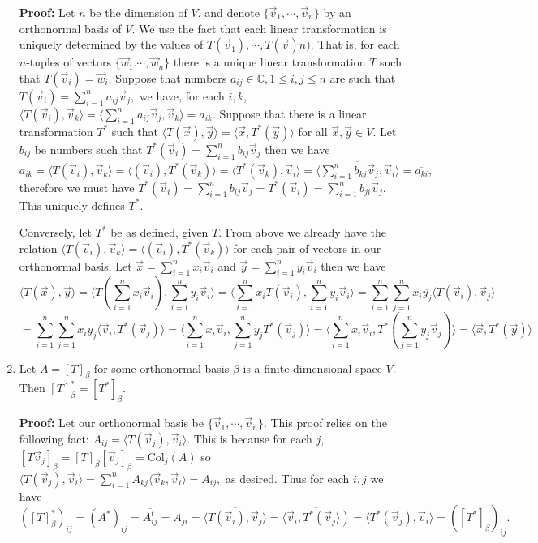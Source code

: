 \documentclass[11pt]{article}
\newcommand{\bbC}{\mathbb C}
\newcommand{\Col}{\mathrm{Col}}
\newcommand{\ol}{\overline}
\newcommand{\inner}[2]{\langle #1, #2\rangle}
\begin{document}
\begin{enumerate}
\textbf{Proof:}
Let $n$ be the dimension of $V$, and denote $\{\vec{v}_1, \cdots , \vec{v}_n\}$ by an orthonormal basis of $V$. 
We use the fact that each linear transformation is uniquely determined by the values of $T(\vec{v}_1), \cdots , T(\vec{v})n)$. 
That is, for each $n$-tuples of vectors $\{\vec{w}_1. \cdots , \vec{w}_n\}$ there is a unique linear transformation $T$ such that $T(\vec{v}_i)=\vec{w}_i.$
Suppose that numbers $a_{ij}\in\bbC, 1\le i, j\le n$ are such that 
$T(\vec{v}_i)=\displaystyle\sum_{i=1}^n a_{ij}\vec{v}_j, $ we have, for each $i, k$, 
$\inner{T(\vec{v}_i)}{\vec{v}_k}
=\inner{\displaystyle\sum_{i=1}^n a_{ij}\vec{v}_j}{\vec{v}_k}
=a_{ik}.  
$
Suppose that there is a linear transformation $T^*$ such that $\inner{T(\vec{x})}{\vec{y}}=\inner{\vec{x}}{T^*(\vec{y})}$ for all $\vec{x}, \vec{y}\in V$. 
Let $b_{ij}$ be numbers such that $T^*(\vec{v}_i)=\displaystyle\sum_{i=1}^n b_{ij}\vec{v}_j$ then we have 
$a_{ik}
=\inner{T(\vec{v}_i)}{\vec{v}_k}
=\inner{(\vec{v}_i)}{T^*(\vec{v}_k)}
=\ol{\inner{T^*(\vec{v}_k)}{\vec{v}_i}}
=\ol{\inner{\displaystyle\sum_{i=1}^n b_{kj}\vec{v}_j}{\vec{v}_i}}
=\ol{a_{ki}}, 
$
therefore we must have 
$T^*(\vec{v}_i)=\displaystyle\sum_{i=1}^n b_{ij}\vec{v}_j
=T^*(\vec{v}_i)=\displaystyle\sum_{i=1}^n \ol{b_{ji}}\vec{v}_j. 
$
This uniquely defines $T^*$. 

Conversely, let $T^*$ be as defined, given $T$. 
From above we already have the relation 
$\inner{T(\vec{v}_i)}{\vec{v}_k}=\inner{(\vec{v}_i)}{T^*(\vec{v}_k)}$ for each pair of vectors in our orthonormal basis. 
Let $\vec{x}=\displaystyle\sum_{i=1}^n x_i\vec{v}_i$ and 
$\vec{y}=\displaystyle\sum_{i=1}^n y_i\vec{v}_i$ then we have 
\[\inner{T(\vec{x})}{\vec{y}}
=\inner{T(\displaystyle\sum_{i=1}^n x_i\vec{v}_i)}{\displaystyle\sum_{i=1}^n y_i\vec{v}_i}
=\inner{\displaystyle \sum_{i=1}^n x_iT(\vec{v}_i)}{\displaystyle\sum_{i=1}^n y_i\vec{v}_i}
=\displaystyle \sum_{i=1}^n \displaystyle \sum_{j=1}^n x_i\ol{y_j}\inner{T(\vec{v}_i)}{\vec{v}_j}\]
\[
=\displaystyle \sum_{i=1}^n \displaystyle \sum_{j=1}^n x_i\ol{y_j}\inner{\vec{v}_i}{T^*(\vec{v}_j)}
=\inner{\displaystyle \sum_{i=1}^n  x_i\vec{v}_i}{\displaystyle \sum_{j=1}^n y_jT^*(\vec{v}_j)}
=\inner{\displaystyle \sum_{i=1}^n  x_i\vec{v}_i}{T^*(\displaystyle \sum_{j=1}^n y_j\vec{v}_j)}
=\inner{\vec{x}}{T^*(\vec{y})}
\]

\item Let $A=[T]_\beta$ for some orthonormal basis $\beta$ is a finite dimensional space $V$. Then $[T]_\beta^*=[T^*]_\beta$. 

\textbf{Proof:} Let our orthonormal basis be $\{\vec{v}_1, \cdots, \vec{v}_n\}$. 
This proof relies on the following fact: $A_{ij}=\inner{T(\vec{v}_j)}{\vec{v}_i}.$ 
This is because for each $j$, 
$[T\vec{v}_j]_\beta
=[T]_\beta[\vec{v}_j]_\beta
=\Col_j(A)
$
so $\inner{T(\vec{v}_j)}{\vec{v}_i}
=
\displaystyle\sum_{i=1}^n A_{kj}\inner{\vec{v}_k}{\vec{v}_i}
=A_{ij},
$ 
as desired. 
Thus for each $i, j$ we have 
$([T]_\beta^*)_{ij}
=(A^*)_{ij}
=\ol{A^t_{ij}}
=\ol{A_{ji}}
=\ol{\inner{T(\vec{v}_i)}{\vec{v}_j}}
=\ol{\inner{\vec{v}_i}{T^*(\vec{v}_j})}
=\inner{T^*(\vec{v}_j)}{\vec{v}_i}
=([T^*]_\beta)_{ij}. 
$


\end{enumerate}
\end{document}
